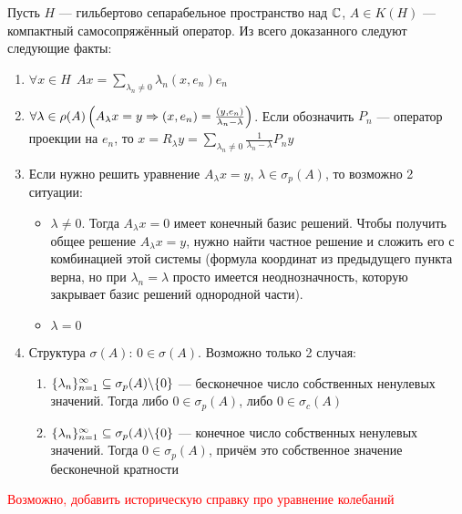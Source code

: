 \begin{note}
	Пусть $H$ --- гильбертово сепарабельное пространство над $\mathbb{C}$, $A \in K(H)$ --- компактный самосопряжённый оператор. Из всего доказанного следуют следующие факты:
	\begin{enumerate}
		\item $\forall x \in H\ \ Ax = \sum_{\lambda_n \neq 0} \lambda_n(x, e_n)e_n$
		
		\item $\forall \lambda \in \rho(A) \left(A_\lambda x = y \Rightarrow (x, e_n) = \frac{(y, e_n)}{\lambda_n - \lambda}\right)$. Если обозначить $P_n$ --- оператор проекции на $e_n$, то $x = R_\lambda y = \sum_{\lambda_n \neq 0} \frac{1}{\lambda_n - \lambda} P_ny$
		
		\item Если нужно решить уравнение $A_\lambda x = y$, $\lambda \in \sigma_p(A)$, то возможно 2 ситуации:
		\begin{itemize}
			\item $\lambda \neq 0$. Тогда $A_\lambda x = 0$ имеет конечный базис решений. Чтобы получить общее решение $A_\lambda x = y$, нужно найти частное решение и сложить его с комбинацией этой системы (формула координат из предыдущего пункта верна, но при $\lambda_n = \lambda$ просто имеется неоднозначность, которую закрывает базис решений однородной части).
			
			\item $\lambda = 0$
		\end{itemize}
		
		\item Структура $\sigma(A)$: $0 \in \sigma(A)$. Возможно только 2 случая:
		\begin{enumerate}
			\item $\{\lambda_n\}_{n = 1}^\infty \subseteq \sigma_p(A) \backslash \{0\}$ --- бесконечное число собственных ненулевых значений. Тогда либо $0 \in \sigma_p(A)$, либо $0 \in \sigma_c(A)$
			
			\item $\{\lambda_n\}_{n = 1}^\infty \subseteq \sigma_p(A) \backslash \{0\}$ --- конечное число собственных ненулевых значений. Тогда $0 \in \sigma_p(A)$, причём это собственное значение бесконечной кратности
		\end{enumerate}
	\end{enumerate}
\end{note}

\textcolor{red}{Возможно, добавить историческую справку про уравнение колебаний}